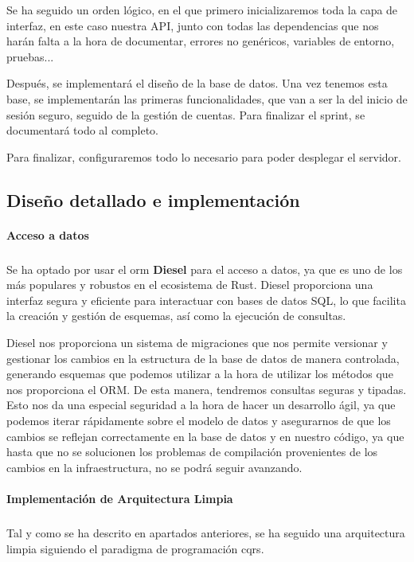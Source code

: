 Se ha seguido un orden lógico, en el que primero inicializaremos toda la capa de interfaz, en este caso nuestra API, junto con todas las dependencias que nos harán falta a la hora de documentar, errores no genéricos, variables de entorno, pruebas...

Después, se implementará el diseño de la base de datos. Una vez tenemos esta base, se implementarán las primeras funcionalidades, que van a ser la del inicio de sesión seguro, seguido de la gestión de cuentas. Para finalizar el sprint, se documentará todo al completo.

Para finalizar, configuraremos todo lo necesario para poder desplegar el servidor.

\subsection{Diseño detallado e implementación}

\paragraph{Acceso a datos}
\subparagraph{}
Se ha optado por usar el \acrshort{orm} \textbf{Diesel} para el acceso a datos, ya que es uno de los más populares y robustos en el ecosistema de Rust. Diesel proporciona una interfaz segura y eficiente para interactuar con bases de datos SQL, lo que facilita la creación y gestión de esquemas, así como la ejecución de consultas.

Diesel nos proporciona un sistema de migraciones que nos permite versionar y gestionar los cambios en la estructura de la base de datos de manera controlada, generando esquemas que podemos utilizar a la hora de utilizar los métodos que nos proporciona el ORM. De esta manera, tendremos consultas seguras y tipadas.
Esto nos da una especial seguridad a la hora de hacer un desarrollo ágil, ya que podemos iterar rápidamente sobre el modelo de datos y asegurarnos de que los cambios se reflejan correctamente en la base de datos y en nuestro código, ya que hasta que no se solucionen los problemas de compilación provenientes de los cambios en la infraestructura, no se podrá seguir avanzando.

\paragraph{Implementación de Arquitectura Limpia}
\subparagraph{}

Tal y como se ha descrito en apartados anteriores, se ha seguido una arquitectura limpia siguiendo el paradigma de programación \acrshort{cqrs}.


